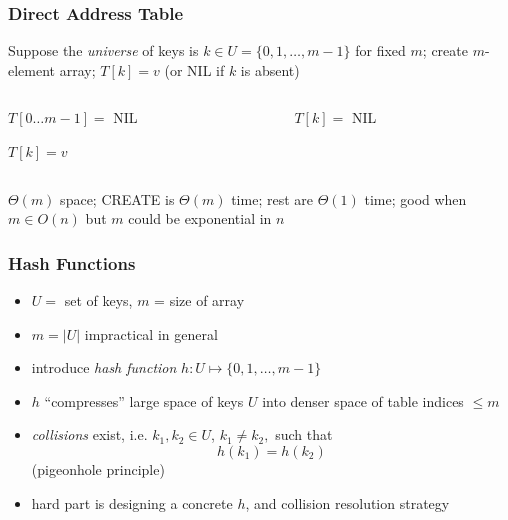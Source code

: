 \documentclass{beamer}
\begin{document}
\begin{frame} \frametitle{Direct Address Table}
Suppose the \emph{universe} of keys is $k \in U=\{0, 1, \ldots, m-1\}$ for
fixed $m$; create $m$-element array; $T[k]=v$ (or NIL if $k$ is absent)
\vspace{.5cm}
\begin{columns}
\begin{column}{0.5\textwidth}
  {\small

  \begin{algorithmic}[1]
    \State $T[0 \ldots m-1] = $ NIL
    \EndFunction
  \end{algorithmic}

  \begin{algorithmic}[1]
    \State $T[k] = v$
    \EndFunction
  \end{algorithmic}

  }

\end{column}
\begin{column}{0.5\textwidth}
  {\small

  \begin{algorithmic}[1]
    \State {}
    \EndFunction
  \end{algorithmic}

  \begin{algorithmic}[1]
    \State $T[k] = $ NIL
    \EndFunction
  \end{algorithmic}

  }
\end{column}
\end{columns}
\vspace{.5cm}
$\Theta(m)$ space; CREATE is $\Theta(m)$ time; rest are $\Theta(1)$ time;
good when $m \in O(n)$ but $m$ could be exponential in $n$
\end{frame}

\begin{frame} \frametitle{Hash Functions}
\begin{itemize}
  \item $U = $ set of keys, $m$ = size of array
  \item $m=|U|$ impractical in general
  \item introduce \emph{hash function} $h : U \mapsto \{0, 1, \ldots, m-1 \}$
  \item $h$ ``compresses'' large space of keys $U$ into denser space of table
    indices $\leq m$
  \item \emph{collisions} exist, i.e. $k_1, k_2 \in U$,
    $k_1 \ne k_2,$
    such that \[ h(k_1) = h(k_2) \]
    (pigeonhole principle)
  \item hard part is designing a concrete $h$, and collision resolution
    strategy
\end{itemize}
\end{frame}
\end{document}
